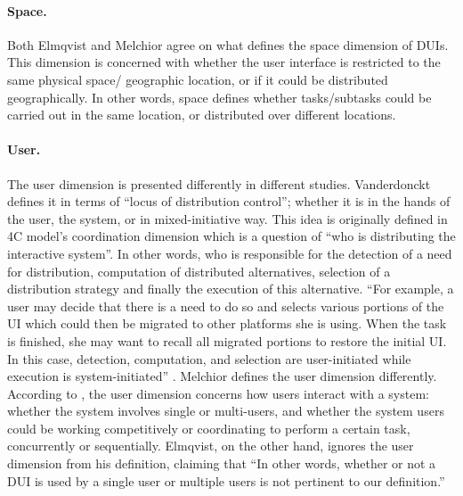 \paragraph{Space.}  Both Elmqvist \cite{elmqvist2011distributed} and Melchior
\cite{melchior2011distributed} agree on what defines the space  dimension of
DUIs. This dimension is concerned with whether the user interface is
restricted to the same physical space/ geographic location, or if it could be
distributed geographically. In other words, space defines whether tasks/subtasks
could be carried out in the same location, or distributed over different
locations. 

\paragraph{User.} The user dimension is presented differently in different
studies. Vanderdonckt \cite{vanderdonckt2010distributed} defines it in terms of 
``locus of distribution control''; whether it is in the hands of the user, the
system, or in mixed-initiative way. This idea is originally defined in 4C
model's coordination dimension which is a question of ``who is distributing the interactive system''\cite{demeure20084c}.
In other words, who is responsible for the detection of a need for distribution,
computation of distributed alternatives, selection of a distribution strategy and
finally the execution of this alternative. ``For example, a user may decide
that there is a need to do so and selects various portions of the UI which could
then be migrated to other platforms she is using. When the task is finished, she
may want to recall all migrated portions to restore the initial UI. In this
case, detection, computation, and selection are user-initiated while execution
is system-initiated'' \cite{demeure20084c}. Melchior defines the user dimension
differently. According to \cite{melchior2011distributed}, the user dimension concerns how users interact
with a system: whether the system involves single or multi-users, and whether
the system users could be working competitively or coordinating to perform a
certain task, concurrently or sequentially. Elmqvist, on the other hand, ignores
the user dimension from his definition, claiming that ``In other words, whether or not a DUI is used by a single user or multiple users is not pertinent to our
definition.''\cite{elmqvist2011distributed}


